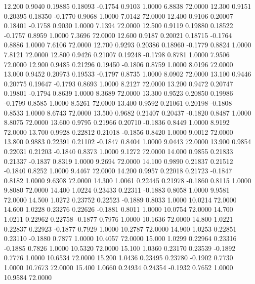   12.200   0.9040   0.19885   0.18093  -0.1754   0.9103   1.0000   6.8838  72.0000
  12.300   0.9151   0.20395   0.18350  -0.1770   0.9068   1.0000   7.0142  72.0000
  12.400   0.9106   0.20007   0.18401  -0.1758   0.9030   1.0000   7.1394  72.0000
  12.500   0.9119   0.19880   0.18522  -0.1757   0.8959   1.0000   7.3696  72.0000
  12.600   0.9187   0.20021   0.18715  -0.1764   0.8886   1.0000   7.6106  72.0000
  12.700   0.9293   0.20386   0.18960  -0.1779   0.8824   1.0000   7.8121  72.0000
  12.800   0.9426   0.21007   0.19248  -0.1798   0.8781   1.0000   7.9506  72.0000
  12.900   0.9485   0.21296   0.19450  -0.1806   0.8759   1.0000   8.0196  72.0000
  13.000   0.9452   0.20973   0.19533  -0.1797   0.8735   1.0000   8.0902  72.0000
  13.100   0.9446   0.20775   0.19647  -0.1793   0.8693   1.0000   8.2127  72.0000
  13.200   0.9472   0.20747   0.19801  -0.1794   0.8639   1.0000   8.3689  72.0000
  13.300   0.9523   0.20850   0.19986  -0.1799   0.8585   1.0000   8.5261  72.0000
  13.400   0.9592   0.21061   0.20198  -0.1808   0.8533   1.0000   8.6743  72.0000
  13.500   0.9682   0.21407   0.20437  -0.1820   0.8487   1.0000   8.8075  72.0000
  13.600   0.9795   0.21966   0.20710  -0.1836   0.8449   1.0000   8.9192  72.0000
  13.700   0.9928   0.22812   0.21018  -0.1856   0.8420   1.0000   9.0012  72.0000
  13.800   0.9883   0.22391   0.21102  -0.1847   0.8404   1.0000   9.0443  72.0000
  13.900   0.9854   0.22031   0.21203  -0.1840   0.8373   1.0000   9.1272  72.0000
  14.000   0.9855   0.21833   0.21337  -0.1837   0.8319   1.0000   9.2694  72.0000
  14.100   0.9890   0.21837   0.21512  -0.1840   0.8252   1.0000   9.4467  72.0000
  14.200   0.9957   0.22018   0.21723  -0.1847   0.8182   1.0000   9.6308  72.0000
  14.300   1.0061   0.22445   0.21978  -0.1860   0.8115   1.0000   9.8080  72.0000
  14.400   1.0224   0.23433   0.22311  -0.1883   0.8058   1.0000   9.9581  72.0000
  14.500   1.0272   0.23752   0.22523  -0.1889   0.8033   1.0000  10.0214  72.0000
  14.600   1.0228   0.23276   0.22626  -0.1881   0.8011   1.0000  10.0754  72.0000
  14.700   1.0211   0.22962   0.22758  -0.1877   0.7976   1.0000  10.1636  72.0000
  14.800   1.0221   0.22837   0.22923  -0.1877   0.7929   1.0000  10.2787  72.0000
  14.900   1.0253   0.22851   0.23110  -0.1880   0.7877   1.0000  10.4057  72.0000
  15.000   1.0299   0.22964   0.23316  -0.1885   0.7826   1.0000  10.5320  72.0000
  15.100   1.0360   0.23170   0.23539  -0.1892   0.7776   1.0000  10.6534  72.0000
  15.200   1.0436   0.23495   0.23780  -0.1902   0.7730   1.0000  10.7673  72.0000
  15.400   1.0660   0.24934   0.24354  -0.1932   0.7652   1.0000  10.9584  72.0000
